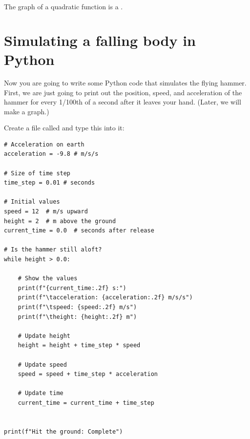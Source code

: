 \hspace{4mm}

The graph of a quadratic function is a .

\section{Simulating a falling body in Python}

Now you are going to write some Python code that simulates the flying hammer. 
First, we are just going to print out the position, speed, and acceleration of 
the hammer for every 1/100th of a second after it leaves your hand. (Later, we 
will make a graph.)

Create a file called  and type this into it:

\begin{verbatim}
# Acceleration on earth
acceleration = -9.8 # m/s/s

# Size of time step
time_step = 0.01 # seconds

# Initial values
speed = 12  # m/s upward
height = 2  # m above the ground
current_time = 0.0  # seconds after release

# Is the hammer still aloft?
while height > 0.0:

    # Show the values
    print(f"{current_time:.2f} s:")
    print(f"\tacceleration: {acceleration:.2f} m/s/s")
    print(f"\tspeed: {speed:.2f} m/s")
    print(f"\theight: {height:.2f} m")

    # Update height
    height = height + time_step * speed

    # Update speed
    speed = speed + time_step * acceleration

    # Update time
    current_time = current_time + time_step


print(f"Hit the ground: Complete")
\end{verbatim}

